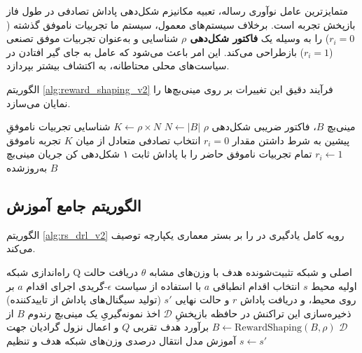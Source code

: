 \documentclass[oneside,openany,phd]{TMU-Thesis}
\begin{document}
متمایزترین عامل نوآوری رساله، تعبیه مکانیزم شکل‌دهی پاداش تصادفی در طول فاز بازپخش تجربه است. برخلاف سیستم‌های معمول، سیستم ما تجربیات ناموفق گذشته ($r_i=0$) را به وسیله یک \textbf{فاکتور شکل‌دهی $\rho$} شناسایی و به‌عنوان تجربیات موفق تصنعی ($r_i=1$) بازطراحی می‌کند. این امر باعث می‌شود که عامل به جای گیر افتادن در سیاست‌های محلی محتاطانه، به اکتشاف بیشتر بپردازد.

الگوریتم \ref{alg:reward_shaping_v2} فرآیند دقیق این تغییرات بر روی مینی‌بچ‌ها را نمایان می‌سازد.

\begin{algorithm}[H]
\caption{شکل‌دهی پاداش ()}
\label{alg:reward_shaping_v2}
\begin{algorithmic}[1]
\renewcommand{\algorithmicrequire}{\textbf{ورودی:}}
\renewcommand{\algorithmicensure}{\textbf{خروجی:}}
\REQUIRE مینی‌بچ $B$، فاکتور ضریبی شکل‌دهی $\rho$
\STATE $N \leftarrow |B|$
\STATE $K \leftarrow \rho \times N$ 
\STATE شناسایی تجربیات ناموفقِ پیشین به شرط داشتن مقدار $r_i = 0$
    \STATE انتخاب تصادفی متعادل از میان $K$ تجربه ناموفق
        \STATE $r_i \leftarrow 1$ 
    \ENDFOR
\ELSE
    \STATE تمام تجربیات ناموفق حاضر را با پاداش ثابت ۱ شکل‌دهی کن
\ENDIF
\RETURN جریان مینی‌بچ به‌روزشده $B$
\end{algorithmic}
\end{algorithm}

\subsection{الگوریتم جامع آموزش }

الگوریتم \ref{alg:rs_drl_v2} رویه کامل یادگیری در  را بر بستر معماری یکپارچه توصیف می‌کند.

\begin{algorithm}[H]
\caption{الگوریتم یکپارچه یادگیری }
\label{alg:rs_drl_v2}
\begin{algorithmic}[1]
\STATE راه‌اندازی شبکه Q اصلی و شبکه تثبیت‌شونده هدف با وزن‌های مشابه $\theta$
    \STATE دریافت حالت اولیه محیط $s$
        \STATE انتخاب اقدام انطباقی $a$ با استفاده از سیاست $\epsilon$-گریدی
        \STATE اجرای اقدام $a$ بر روی محیط، و دریافت پاداش $r$ و حالت نهایی $s'$ (تولید سیگنال‌های پاداش از تاییدکننده)
        \STATE ذخیره‌سازی این تراکنش در حافظه بازپخشِ $\mathcal{D}$
        \STATE اخذ نمونه‌گیریِ یک مینی‌بچ رندوم $B$ از $\mathcal{D}$
            \STATE $B \leftarrow \text{RewardShaping}(B, \rho)$ 
        \ENDIF
        \STATE برآورد هدف تقربی $Q$ و اعمال نزول گرادیان جهت آموزش مدل
        \STATE انتقال درصدی وزن‌های شبکه هدف و تنظیم $s \leftarrow s'$
    \ENDWHILE
\ENDFOR
\end{algorithmic}
\end{algorithm}
\end{document}
